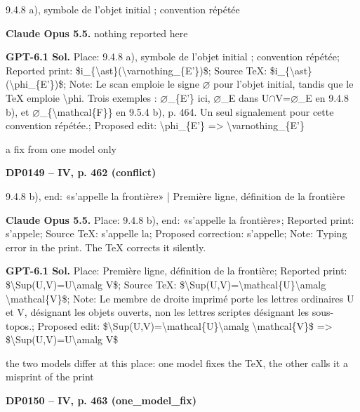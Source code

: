 9.4.8 a), symbole de l'objet initial ; convention répétée\par
\textbf{Claude Opus 5.5.} nothing reported here\par
\textbf{GPT-6.1 Sol.} Place: 9.4.8 a), symbole de l'objet initial ; convention répétée; Reported print: \$i\_\{\textbackslash{}ast\}(\textbackslash{}varnothing\_\{E'\})\$; Source TeX: \$i\_\{\textbackslash{}ast\}(\textbackslash{}phi\_\{E'\})\$; Note: Le scan emploie le signe \ensuremath{\varnothing} pour l'objet initial, tandis que le TeX emploie \textbackslash{}phi. Trois exemples : \ensuremath{\varnothing}\_\{E'\} ici, \ensuremath{\varnothing}\_E dans U\ensuremath{\cap}V=\allowbreak \ensuremath{\varnothing}\_E en 9.4.8 b), et \ensuremath{\varnothing}\_\{\textbackslash{}mathcal\{F\}\} en 9.5.4 b), p. 464. Un seul signalement pour cette convention répétée.; Proposed edit: \textbackslash{}phi\_\{E'\} =\allowbreak > \textbackslash{}varnothing\_\{E'\}\par
a fix from one model only\par
\par\noindent\hypertarget{DP0149}{}\textbf{DP0149 -- IV, p. 462 (conflict)}\par
9.4.8 b), end: «s'appelle la frontière» | Première ligne, définition de la frontière\par
\textbf{Claude Opus 5.5.} Place: 9.4.8 b), end: «s'appelle la frontière»; Reported print: s'appele; Source TeX: s'appelle la; Proposed correction: s'appelle; Note: Typing error in the print. The TeX corrects it silently.\par
\textbf{GPT-6.1 Sol.} Place: Première ligne, définition de la frontière; Reported print: \$\textbackslash{}Sup(U,V)=\allowbreak U\textbackslash{}amalg V\$; Source TeX: \$\textbackslash{}Sup(U,V)=\allowbreak \textbackslash{}mathcal\{U\}\textbackslash{}amalg \textbackslash{}mathcal\{V\}\$; Note: Le membre de droite imprimé porte les lettres ordinaires U et V, désignant les objets ouverts, non les lettres scriptes désignant les sous-topos.; Proposed edit: \$\textbackslash{}Sup(U,V)=\allowbreak \textbackslash{}mathcal\{U\}\textbackslash{}amalg \textbackslash{}mathcal\{V\}\$ =\allowbreak > \$\textbackslash{}Sup(U,V)=\allowbreak U\textbackslash{}amalg V\$\par
the two models differ at this place: one model fixes the TeX, the other calls it a misprint of the print\par
\par\noindent\hypertarget{DP0150}{}\textbf{DP0150 -- IV, p. 463 (one\_model\_fix)}\par
